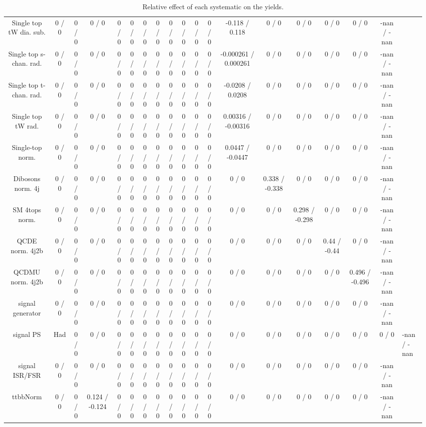 \documentclass[10pt]{article}
\begin{document}
\begin{table}[htbp]
\begin{center}
\begin{tabular}{|c|c|c|c|c|c|c|c|c|c|c|c|c|c|c|c|c|c|}
  Single top tW dia. sub. & 0 / 0 & 0 / 0 & 0 / 0 & 0 / 0 & 0 / 0 & 0 / 0 & 0 / 0 & 0 / 0 & 0 / 0 & 0 / 0 & 0 / 0 & -0.118 / 0.118 & 0 / 0 & 0 / 0 & 0 / 0 & 0 / 0 & -nan / -nan \\ 
  Single top s-chan. rad. & 0 / 0 & 0 / 0 & 0 / 0 & 0 / 0 & 0 / 0 & 0 / 0 & 0 / 0 & 0 / 0 & 0 / 0 & 0 / 0 & 0 / 0 & -0.000261 / 0.000261 & 0 / 0 & 0 / 0 & 0 / 0 & 0 / 0 & -nan / -nan \\ 
  Single top t-chan. rad. & 0 / 0 & 0 / 0 & 0 / 0 & 0 / 0 & 0 / 0 & 0 / 0 & 0 / 0 & 0 / 0 & 0 / 0 & 0 / 0 & 0 / 0 & -0.0208 / 0.0208 & 0 / 0 & 0 / 0 & 0 / 0 & 0 / 0 & -nan / -nan \\ 
  Single top tW rad. & 0 / 0 & 0 / 0 & 0 / 0 & 0 / 0 & 0 / 0 & 0 / 0 & 0 / 0 & 0 / 0 & 0 / 0 & 0 / 0 & 0 / 0 & 0.00316 / -0.00316 & 0 / 0 & 0 / 0 & 0 / 0 & 0 / 0 & -nan / -nan \\ 
  Single-top norm. & 0 / 0 & 0 / 0 & 0 / 0 & 0 / 0 & 0 / 0 & 0 / 0 & 0 / 0 & 0 / 0 & 0 / 0 & 0 / 0 & 0 / 0 & 0.0447 / -0.0447 & 0 / 0 & 0 / 0 & 0 / 0 & 0 / 0 & -nan / -nan \\ 
  Dibosons norm. 4j & 0 / 0 & 0 / 0 & 0 / 0 & 0 / 0 & 0 / 0 & 0 / 0 & 0 / 0 & 0 / 0 & 0 / 0 & 0 / 0 & 0 / 0 & 0 / 0 & 0.338 / -0.338 & 0 / 0 & 0 / 0 & 0 / 0 & -nan / -nan \\ 
  SM 4tops norm. & 0 / 0 & 0 / 0 & 0 / 0 & 0 / 0 & 0 / 0 & 0 / 0 & 0 / 0 & 0 / 0 & 0 / 0 & 0 / 0 & 0 / 0 & 0 / 0 & 0 / 0 & 0.298 / -0.298 & 0 / 0 & 0 / 0 & -nan / -nan \\ 
  QCDE norm. 4j2b & 0 / 0 & 0 / 0 & 0 / 0 & 0 / 0 & 0 / 0 & 0 / 0 & 0 / 0 & 0 / 0 & 0 / 0 & 0 / 0 & 0 / 0 & 0 / 0 & 0 / 0 & 0 / 0 & 0.44 / -0.44 & 0 / 0 & -nan / -nan \\ 
  QCDMU norm. 4j2b & 0 / 0 & 0 / 0 & 0 / 0 & 0 / 0 & 0 / 0 & 0 / 0 & 0 / 0 & 0 / 0 & 0 / 0 & 0 / 0 & 0 / 0 & 0 / 0 & 0 / 0 & 0 / 0 & 0 / 0 & 0.496 / -0.496 & -nan / -nan \\ 
  signal generator & 0 / 0 & 0 / 0 & 0 / 0 & 0 / 0 & 0 / 0 & 0 / 0 & 0 / 0 & 0 / 0 & 0 / 0 & 0 / 0 & 0 / 0 & 0 / 0 & 0 / 0 & 0 / 0 & 0 / 0 & 0 / 0 & -nan / -nan \\ 
  signal PS & Had & 0 / 0 & 0 / 0 & 0 / 0 & 0 / 0 & 0 / 0 & 0 / 0 & 0 / 0 & 0 / 0 & 0 / 0 & 0 / 0 & 0 / 0 & 0 / 0 & 0 / 0 & 0 / 0 & 0 / 0 & 0 / 0 & -nan / -nan \\ 
  signal ISR/FSR & 0 / 0 & 0 / 0 & 0 / 0 & 0 / 0 & 0 / 0 & 0 / 0 & 0 / 0 & 0 / 0 & 0 / 0 & 0 / 0 & 0 / 0 & 0 / 0 & 0 / 0 & 0 / 0 & 0 / 0 & 0 / 0 & -nan / -nan \\ 
 ttbbNorm & 0 / 0 & 0 / 0 & 0.124 / -0.124 & 0 / 0 & 0 / 0 & 0 / 0 & 0 / 0 & 0 / 0 & 0 / 0 & 0 / 0 & 0 / 0 & 0 / 0 & 0 / 0 & 0 / 0 & 0 / 0 & 0 / 0 & -nan / -nan \\ 
\hline 
\end{tabular} 
\caption{Relative effect of each systematic on the yields.} 
\end{center} 
\end{table} 
\end{document}
